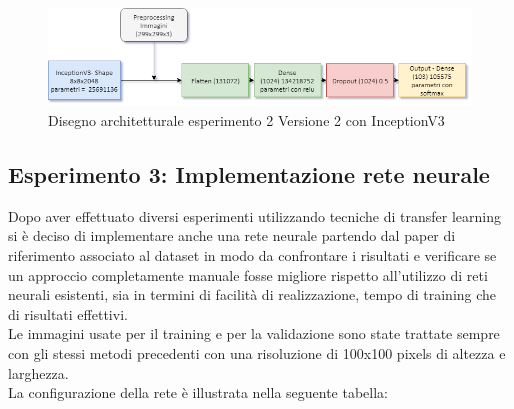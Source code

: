 \begin{figure}
    \centering
    \includegraphics[width=1\textwidth]{./resources/AdvanceMachineLearningSchema-Esperimento2_V2.png}
    \caption{Disegno architetturale esperimento 2 Versione 2 con InceptionV3} 
    \label{fig:architettura-esperimento2_V2}
\end{figure}



\subsection{Esperimento 3: Implementazione rete neurale}
Dopo aver effettuato diversi esperimenti utilizzando tecniche di transfer learning si è deciso di implementare anche una rete neurale partendo dal paper di riferimento associato al dataset \cite{customnet} in modo da confrontare i risultati e verificare se un approccio completamente manuale fosse migliore rispetto all'utilizzo di reti neurali esistenti, sia in termini di facilità di realizzazione, tempo di training che di risultati effettivi. \\
Le immagini usate per il training e per la validazione sono state trattate sempre con gli stessi metodi precedenti con una risoluzione di 100x100 pixels di altezza e larghezza. \\
La configurazione della rete è illustrata nella seguente tabella: \\

